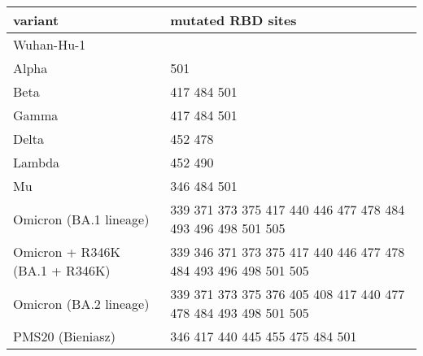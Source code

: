 \begin{tabular}{ll}
\toprule
                       variant &                                               mutated RBD sites \\
\midrule
                    Wuhan-Hu-1 &                                                                 \\
                         Alpha &                                                             501 \\
                          Beta &                                                     417 484 501 \\
                         Gamma &                                                     417 484 501 \\
                         Delta &                                                         452 478 \\
                        Lambda &                                                         452 490 \\
                            Mu &                                                     346 484 501 \\
        Omicron (BA.1 lineage) &     339 371 373 375 417 440 446 477 478 484 493 496 498 501 505 \\
Omicron + R346K (BA.1 + R346K) & 339 346 371 373 375 417 440 446 477 478 484 493 496 498 501 505 \\
        Omicron (BA.2 lineage) & 339 371 373 375 376 405 408 417 440 477 478 484 493 498 501 505 \\
              PMS20 (Bieniasz) &                                 346 417 440 445 455 475 484 501 \\
\bottomrule
\end{tabular}
